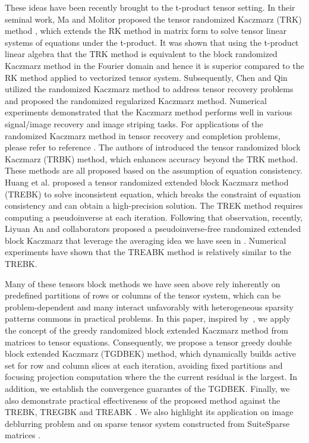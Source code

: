 \documentclass[11pt]{article}
\begin{document}
These ideas have been recently brought to the t-product tensor setting. In their seminal work, Ma and Molitor \cite{molitor2022} proposed  the tensor randomized Kaczmarz (TRK) method , which extends the RK method in matrix form to solve tensor linear systems of equations under the t-product. It was shown that using the t-product linear algebra that the TRK method  is equivalent to the block randomized Kaczmarz method in the Fourier domain and hence it is superior compared to the  RK  method applied to vectorized tensor system. Subsequently, Chen and Qin\cite{chen2021} utilized the randomized Kaczmarz method to address tensor recovery problems and proposed the randomized regularized Kaczmarz method. Numerical experiments demonstrated that the Kaczmarz method performs well in various signal/image recovery and image striping tasks. For applications of the randomized Kaczmarz method in tensor recovery and completion problems, please refer to reference \cite{chen2021,wang2022, wang2023, lia2024, zhang2024}. The authors of \cite{ba02020TRB} introduced the tensor randomized block Kaczmarz (TRBK) method, which enhances accuracy beyond the TRK method. These methods are all proposed based on the assumption of equation consistency. Huang et al. \cite{huang2023TREK} proposed a tensor randomized extended block Kaczmarz method (TREBK) to solve inconsistent equation, which breaks the constraint of equation consistency and can obtain a high-precision solution. The TREK method requires computing a pseudoinverse at each iteration. Following that observation, recently,  Liyuan An and collaborators \cite{lian2024TREABK} proposed a pseudoinverse-free randomized extended block Kaczmarz that  leverage the averaging idea  we have seen in \cite{necoara2019faste, du2020rando}. Numerical experiments have shown that the TREABK method is relatively similar to the TREBK.

Many of these tensors block methods we have seen above \cite{lian2024TREABK, ba02020TRB} rely inherently on predefined partitions of  rows or columns of the tensor system, which can be problem-dependent and many interact unfavorably with heterogeneous sparsity patterns commons in practical problems.  In this paper, inspired by~\cite{su2025}, we apply the concept of the greedy randomized block  extended Kaczmarz method
from matrices to tensor equations. Consequently,  we propose a tensor greedy double block extended Kaczmarz (TGDBEK) method, which dynamically builds active set for row and column slices at each iteration, avoiding fixed partitions and focusing  projection computation where the  the current residual is the largest. In addition, we establish the convergence guarantes of the TGDBEK. Finally, we also demonstrate practical effectiveness of the proposed method against the TREBK, TREGBK \cite{huang2023TREK} and TREABK \cite{su2025}. We also highlight its application on image deblurring problem and on sparse  tensor system constructed from  SuiteSparse matrices \cite{suiteSparse}.
\end{document}
